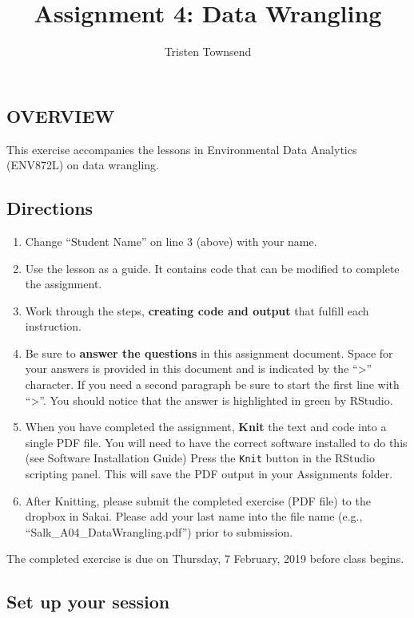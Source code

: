 \documentclass[]{article}
\title{Assignment 4: Data Wrangling}
\author{Tristen Townsend}
\date{}
\providecommand{\tightlist}{%
  \setlength{\itemsep}{0pt}\setlength{\parskip}{0pt}}
\begin{document}
\maketitle

\subsection{OVERVIEW}\label{overview}

This exercise accompanies the lessons in Environmental Data Analytics
(ENV872L) on data wrangling.

\subsection{Directions}\label{directions}

\begin{enumerate}
\def\labelenumi{\arabic{enumi}.}
\tightlist
\item
  Change ``Student Name'' on line 3 (above) with your name.
\item
  Use the lesson as a guide. It contains code that can be modified to
  complete the assignment.
\item
  Work through the steps, \textbf{creating code and output} that fulfill
  each instruction.
\item
  Be sure to \textbf{answer the questions} in this assignment document.
  Space for your answers is provided in this document and is indicated
  by the ``\textgreater{}'' character. If you need a second paragraph be
  sure to start the first line with ``\textgreater{}''. You should
  notice that the answer is highlighted in green by RStudio.
\item
  When you have completed the assignment, \textbf{Knit} the text and
  code into a single PDF file. You will need to have the correct
  software installed to do this (see Software Installation Guide) Press
  the \texttt{Knit} button in the RStudio scripting panel. This will
  save the PDF output in your Assignments folder.
\item
  After Knitting, please submit the completed exercise (PDF file) to the
  dropbox in Sakai. Please add your last name into the file name (e.g.,
  ``Salk\_A04\_DataWrangling.pdf'') prior to submission.
\end{enumerate}

The completed exercise is due on Thursday, 7 February, 2019 before class
begins.

\subsection{Set up your session}\label{set-up-your-session}
\end{document}
